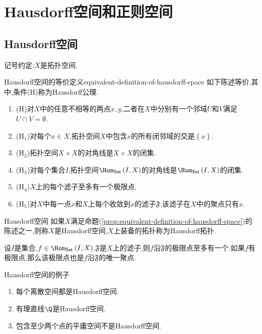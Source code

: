 \chapter{Hausdorff空间和正则空间}

\section{Hausdorff空间}

记号约定:$X$是拓扑空间.

\begin{proposition}{Hausdorff空间的等价定义}{equivalent-definition-of-hausdorff-space}
	如下陈述等价.其中,条件($\mathrm{H}$)称为Hausdorff公理.
	\begin{enumerate}
		\item ($\mathrm{H}$)对$X$中的任意不相等的两点$x,y$,二者在$X$中分别有一个邻域$U$和$V$满足$U\cap V=\emptyset$.
		\item ($\mathrm{H}_{1}$)对每个$x\in X$,拓扑空间$X$中包含$x$的所有闭邻域的交是$\left\{x\right\}$.
		\item ($\mathrm{H}_{2}$)拓扑空间$X\times X$的对角线是$X\times X$的闭集.
		\item ($\mathrm{H}_{3}$)对每个集合$I$,拓扑空间$\Hom_{\mathsf{Set}}\left(I,X\right)$的对角线是$\Hom_{\mathsf{Set}}\left(I,X\right)$的闭集.
		\item ($\mathrm{H}_{4}$)$X$上的每个滤子至多有一个极限点.
		\item ($\mathrm{H}_{5}$)对$X$中每一点$x$和$X$上每个收敛到$x$的滤子$\mathfrak{F}$,该滤子在$X$中的聚点只有$x$.
	\end{enumerate}
\end{proposition}

\begin{definition}{Hausdorff空间}{}
	如果$X$满足命题(\ref{prop:equivalent-definition-of-hausdorff-space})的陈述之一,则称$X$是Hausdorff空间,$X$上装备的拓扑称为Hausdorff拓扑.
\end{definition}

\begin{remark}{}{}
	设$I$是集合,$f\in\Hom_{\mathsf{Set}}\left(I,X\right)$,$\mathfrak{F}$是$X$上的滤子,则$f$沿$\mathfrak{F}$的极限点至多有一个.如果$f$有极限点,那么该极限点也是$f$沿$\mathfrak{F}$的唯一聚点.
\end{remark}

\begin{example}{Hausdorff空间的例子}{}
	\begin{enumerate}
		\item 每个离散空间都是Hausdorff空间.
		\item 有理直线$\Q$是Hausdorff空间.
		\item 包含至少两个点的平庸空间不是Hausdorff空间.
	\end{enumerate}
\end{example}

